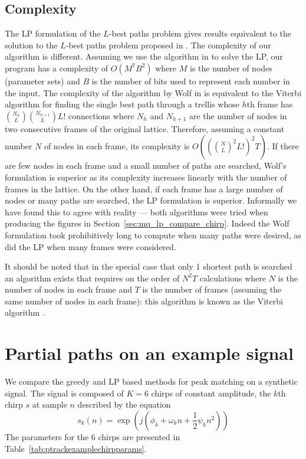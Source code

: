 \subsection{Complexity}

The LP formulation of the $L$-best paths problem gives results equivalent to the
solution to the $L$-best paths problem proposed in \cite{wolf1989finding}. The
complexity of our algorithm is different.  Assuming we
use the algorithm in \cite{karmarkar1984new} to solve the LP, our program has a
complexity of $O(M^{7}B^{2})$ where $M$ is the number of nodes (parameter sets)
and $B$ is the number of bits used to represent each number in the input. The
complexity of the algorithm by Wolf in \cite{wolf1989finding} is equivalent to
the Viterbi algorithm for finding the single best path through a trellis whose
$h$th frame has $\binom{N_{h}}{L}\binom{N_{h+1}}{L}L!$ connections where $N_{h}$
and $N_{h+1}$ are the number of nodes in two consecutive frames of the original
lattice. Therefore, assuming a constant number $N$ of nodes in each frame, its
complexity is $O((\binom{N}{L}^{2}L!)^{2}T)$. If there are few nodes in each
frame and a small number of paths are searched, Wolf's formulation is superior
as its complexity increases linearly with the number of frames in the lattice.
On the other hand, if each frame has a large number of nodes or many paths are
searched, the LP formulation is superior.  Informally we have found this to
agree with reality --- both algorithms were tried when producing the figures in
Section~\ref{sec:mq_lp_compare_chirp}.  Indeed the Wolf formulation took
prohibitively long to compute when many paths were desired, as did the LP when
many frames were considered.

It should be noted that in the special case that only 1 shortest path is
searched an algorithm exists that requires on the order of $N^{2}T$ calculations
\cite{rabiner1989tutorial} where $N$ is the number of nodes in each frame and
$T$ is the number of frames (assuming the same number of nodes in each frame):
this algorithm is known as the Viterbi algorithm \cite{forney1973viterbi}.

\section{Partial paths on an example signal\label{sec:mq_lp_compare_chirp}}

We compare the greedy and LP based methods for peak matching on a synthetic
signal. The signal is composed of $K=6$ chirps of constant amplitude, the $k$th
chirp $s$ at sample $n$ described by the equation
\[
    s_{k}(n) = \exp(j(\phi_{k} + \omega_{k}n +
    \frac{1}{2} \psi_{k} n^{2}))
\]
The parameters for the 6 chirps are presented in
Table~\ref{tab:ptrackexamplechirpparams}.

